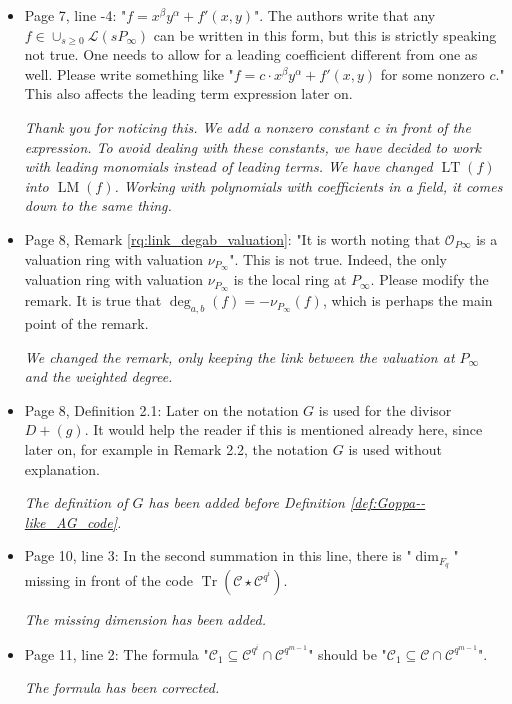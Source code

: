 \documentclass[12pt,a4paper]{amsart}
\DeclareMathOperator{\trace}{Tr}
\newcommand{\calC}{\mathcal{C}}
\newcommand{\Tr}[1]{\trace\!\left(#1\right)}
\begin{document}
\begin{itemize}
\item Page 7, line -4: "$f=x^\beta y^\alpha+f'(x,y)$". The authors write that any $f \in \cup_{s \ge 0} \mathcal{L}(sP_\infty)$ can be written in this form, but this is strictly speaking not true. One needs to allow for a leading coefficient different from one as well. Please write something like "$f=c\cdot x^\beta y^\alpha+f'(x,y)$ for some nonzero $c$." This also affects the leading term expression later on.

\textit{Thank you for noticing this. We add a nonzero constant $c$ in front of the expression. To avoid dealing with these constants, we have decided to work with leading \emph{monomials} instead of leading terms. We have changed $\operatorname{LT}(f)$ into $\operatorname{LM}(f)$. Working with polynomials with coefficients in a field, it comes down to the same thing.}

\item Page 8, Remark \ref{rq:link_degab_valuation}: "It is worth noting that $\mathcal{O}_{P\infty}$ is a valuation ring with valuation $\nu_{P_\infty}$". This is not true. Indeed, the only valuation ring with valuation $\nu_{P_\infty}$ is the local ring at $P_\infty$. Please modify the remark. It is true that $\deg_{a,b}(f)=-\nu_{P_\infty}(f)$, which is perhaps the main point of the remark.

\textit{We changed the remark, only keeping the link between the valuation at $P_\infty$ and the weighted degree.}


\item Page 8, Definition 2.1: Later on the notation $G$ is used for the divisor $D+(g)$. It would help the reader if this is mentioned already here, since later on, for example in Remark 2.2, the notation $G$ is used without explanation.

\textit{The definition of $G$ has been added before Definition \ref{def:Goppa--like_AG_code}.}


\item Page 10, line 3: In the second summation in this line, there is "$\dim_{F_{q}}$" missing in front of the code $\Tr{\calC \star \calC^{q^i}}$.

\textit{The missing dimension has been added.}

\item Page 11, line 2: The formula "$\calC_1 \subseteq \calC^{q^i} \cap \calC^{q^{m-1}}$" should be "$\calC_1 \subseteq \calC \cap \calC^{q^{m-1}}$". 

\textit{The formula has been corrected.}


\end{itemize}
\end{document}
